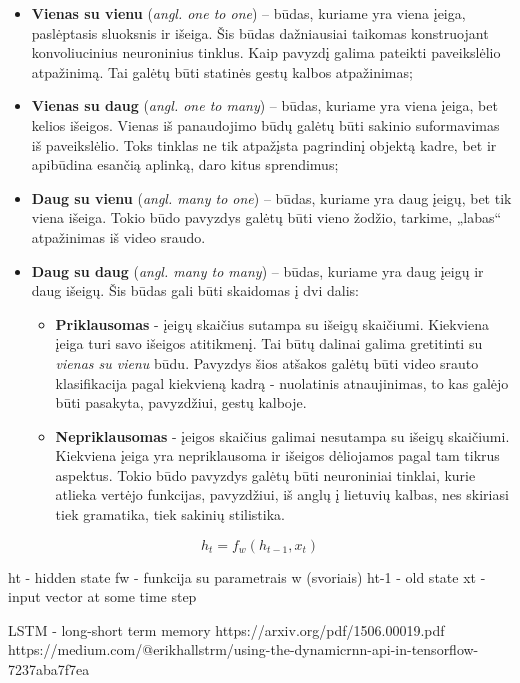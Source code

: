 \documentclass{VUMIFPSbakalaurinis}
\begin{document}
\begin{itemize}
	\item \textbf{Vienas su vienu} (\textit{angl. one to one}) – būdas, kuriame yra viena įeiga, paslėptasis sluoksnis ir išeiga. Šis būdas dažniausiai taikomas konstruojant konvoliucinius neuroninius tinklus. Kaip pavyzdį galima pateikti paveikslėlio atpažinimą. Tai galėtų būti statinės gestų kalbos atpažinimas;
	\item \textbf{Vienas su daug} (\textit{angl. one to many}) – būdas, kuriame yra viena įeiga, bet kelios išeigos. Vienas iš panaudojimo būdų galėtų būti sakinio suformavimas iš paveikslėlio. Toks tinklas ne tik atpažįsta pagrindinį objektą kadre, bet ir apibūdina esančią aplinką, daro kitus sprendimus;
	\item \textbf{Daug su vienu} (\textit{angl. many to one}) – būdas, kuriame yra daug įeigų, bet tik viena išeiga. Tokio būdo pavyzdys galėtų būti vieno žodžio, tarkime, „labas“ atpažinimas iš video sraudo.
	\item \textbf{Daug su daug} (\textit{angl. many to many}) – būdas, kuriame yra daug įeigų ir daug išeigų. Šis būdas gali būti skaidomas į dvi dalis:
	\begin{itemize}
		\item \textbf{Priklausomas} - įeigų skaičius sutampa su išeigų skaičiumi. Kiekviena įeiga turi savo išeigos atitikmenį. Tai būtų dalinai galima gretitinti su \textit{vienas su vienu} būdu. Pavyzdys šios atšakos galėtų būti video srauto klasifikacija pagal kiekvieną kadrą - nuolatinis atnaujinimas, to kas galėjo būti pasakyta, pavyzdžiui, gestų kalboje.
		\item \textbf{Nepriklausomas} - įeigos skaičius galimai nesutampa su išeigų skaičiumi. Kiekviena įeiga yra nepriklausoma ir išeigos dėliojamos pagal tam tikrus aspektus. Tokio būdo pavyzdys galėtų būti neuroniniai tinklai, kurie atlieka vertėjo funkcijas, pavyzdžiui, iš anglų į lietuvių kalbas, nes skiriasi tiek gramatika, tiek sakinių stilistika.
	\end{itemize}
\end{itemize}


\begin{equation}\label{eq:sobelg}
h_t = f_w(h_{t-1}, x_t)
\end{equation}

ht - hidden state
fw - funkcija su parametrais w (svoriais)
ht-1 - old state
xt - input vector at some time step

\cite{DBLP:journals/corr/Lipton15}
LSTM - long-short term memory
https://arxiv.org/pdf/1506.00019.pdf
https://medium.com/@erikhallstrm/using-the-dynamicrnn-api-in-tensorflow-7237aba7f7ea
\end{document}
